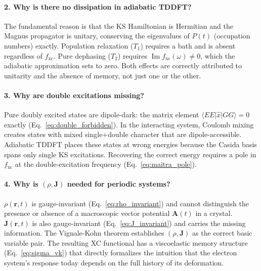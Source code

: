 \documentclass[12pt,letterpaper]{article}
\newcommand{\mel}[3]{\langle #1 \vert #2 \vert #3 \rangle}
\newcommand{\fxc}{f_{\mathrm{xc}}}
\theoremstyle{definition}
\begin{document}
\paragraph{2. Why is there no dissipation in adiabatic TDDFT?}
The fundamental reason is that the KS Hamiltonian is Hermitian and the
Magnus propagator is unitary, conserving the eigenvalues of $P(t)$
(occupation numbers) exactly.  Population relaxation ($T_1$) requires
a bath and is absent regardless of $\fxc$.  Pure dephasing ($T_2$)
requires $\operatorname{Im}\fxc(\omega)\neq 0$, which the adiabatic
approximation sets to zero.  Both effects are correctly attributed to
unitarity and the absence of memory, not just one or the other.

\paragraph{3. Why are double excitations missing?}
Pure doubly excited states are dipole-dark: the matrix element
$\mel{EE}{\hat{x}}{GG} = 0$ exactly (Eq.~\ref{eq:double_forbidden}).
In the interacting system, Coulomb mixing creates states with mixed
single+double character that are dipole-accessible.  Adiabatic TDDFT
places these states at wrong energies because the Casida basis
spans only single KS excitations.  Recovering the correct energy
requires a pole in $\fxc$ at the double-excitation frequency
(Eq.~\ref{eq:maitra_pole}).

\paragraph{4. Why is $(\rho,\bm{J})$ needed for periodic systems?}
$\rho(\bm{r},t)$ is gauge-invariant (Eq.~\ref{eq:rho_invariant}) and
cannot distinguish the presence or absence of a macroscopic vector
potential $\bm{A}(t)$ in a crystal.  $\bm{J}(\bm{r},t)$ is also
gauge-invariant (Eq.~\ref{eq:J_invariant}) and carries the missing
information.  The Vignale-Kohn theorem establishes $(\rho,\bm{J})$
as the correct basic variable pair.  The resulting XC functional has a
viscoelastic memory structure (Eq.~\ref{eq:sigma_vk}) that directly
formalizes the intuition that the electron system's response today
depends on the full history of its deformation.



\end{document}
